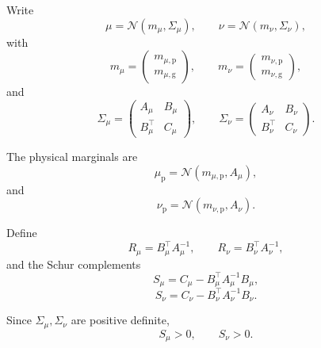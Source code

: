 \documentclass[11pt]{article}
\theoremstyle{remark}
\begin{document}
Write
\begin{equation}
\mu
=
\mathcal N(m_\mu,\Sigma_\mu),
\qquad
\nu
=
\mathcal N(m_\nu,\Sigma_\nu),
\label{eq:gaussians}
\end{equation}
with
\begin{equation}
m_\mu
=
\begin{pmatrix}
m_{\mu,\mathrm p}\\
m_{\mu,\mathrm g}
\end{pmatrix},
\qquad
m_\nu
=
\begin{pmatrix}
m_{\nu,\mathrm p}\\
m_{\nu,\mathrm g}
\end{pmatrix},
\label{eq:means}
\end{equation}
and
\begin{equation}
\Sigma_\mu
=
\begin{pmatrix}
A_\mu&B_\mu\\
B_\mu^\top&C_\mu
\end{pmatrix},
\qquad
\Sigma_\nu
=
\begin{pmatrix}
A_\nu&B_\nu\\
B_\nu^\top&C_\nu
\end{pmatrix}.
\label{eq:blocks}
\end{equation}

The physical marginals are
\begin{equation}
\mu_{\mathrm p}
=
\mathcal N(m_{\mu,\mathrm p},A_\mu),
\label{eq:mu-physical}
\end{equation}
and
\begin{equation}
\nu_{\mathrm p}
=
\mathcal N(m_{\nu,\mathrm p},A_\nu).
\label{eq:nu-physical}
\end{equation}

Define
\begin{equation}
R_\mu
=
B_\mu^\top A_\mu^{-1},
\qquad
R_\nu
=
B_\nu^\top A_\nu^{-1},
\label{eq:R}
\end{equation}
and the Schur complements
\begin{equation}
S_\mu
=
C_\mu-B_\mu^\top A_\mu^{-1}B_\mu,
\label{eq:Smu}
\end{equation}
\begin{equation}
S_\nu
=
C_\nu-B_\nu^\top A_\nu^{-1}B_\nu.
\label{eq:Snu}
\end{equation}

Since \(\Sigma_\mu,\Sigma_\nu\) are positive definite,
\begin{equation}
S_\mu>0,
\qquad
S_\nu>0.
\end{equation}
\end{document}
